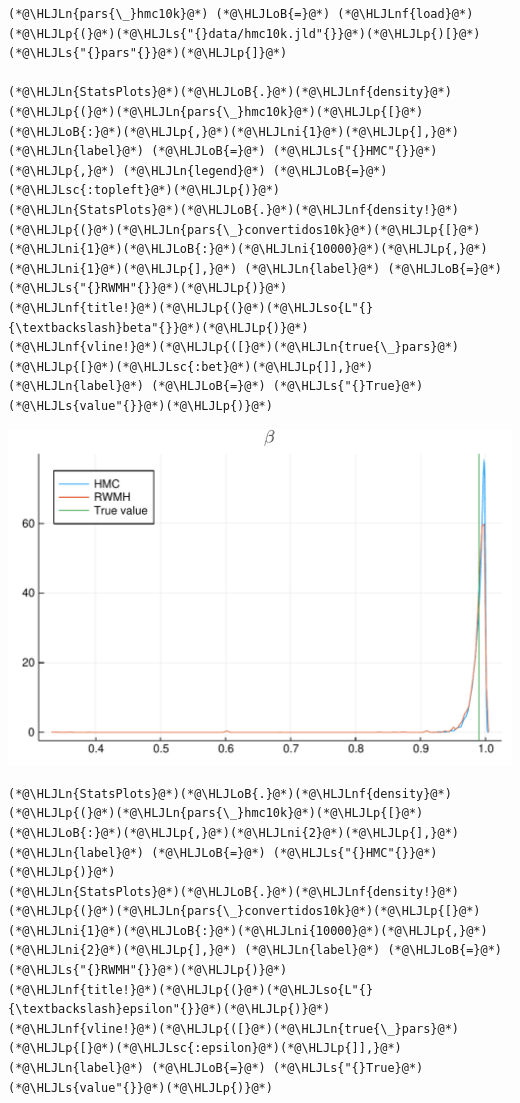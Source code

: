 \documentclass[12pt,a4paper]{article}
\newcommand{\HLJLn}[1]{#1}
\newcommand{\HLJLnf}[1]{\textcolor[RGB]{66,102,213}{#1}}
\newcommand{\HLJLs}[1]{\textcolor[RGB]{201,61,57}{#1}}
\newcommand{\HLJLsc}[1]{\textcolor[RGB]{201,61,57}{#1}}
\newcommand{\HLJLso}[1]{\textcolor[RGB]{201,61,57}{#1}}
\newcommand{\HLJLni}[1]{\textcolor[RGB]{59,151,46}{#1}}
\newcommand{\HLJLoB}[1]{\textcolor[RGB]{102,102,102}{\textbf{#1}}}
\newcommand{\HLJLp}[1]{#1}
\begin{document}
\begin{lstlisting}
(*@\HLJLn{pars{\_}hmc10k}@*) (*@\HLJLoB{=}@*) (*@\HLJLnf{load}@*)(*@\HLJLp{(}@*)(*@\HLJLs{"{}data/hmc10k.jld"{}}@*)(*@\HLJLp{)[}@*)(*@\HLJLs{"{}pars"{}}@*)(*@\HLJLp{]}@*)

(*@\HLJLn{StatsPlots}@*)(*@\HLJLoB{.}@*)(*@\HLJLnf{density}@*)(*@\HLJLp{(}@*)(*@\HLJLn{pars{\_}hmc10k}@*)(*@\HLJLp{[}@*)(*@\HLJLoB{:}@*)(*@\HLJLp{,}@*)(*@\HLJLni{1}@*)(*@\HLJLp{],}@*) (*@\HLJLn{label}@*) (*@\HLJLoB{=}@*) (*@\HLJLs{"{}HMC"{}}@*)(*@\HLJLp{,}@*) (*@\HLJLn{legend}@*) (*@\HLJLoB{=}@*) (*@\HLJLsc{:topleft}@*)(*@\HLJLp{)}@*)
(*@\HLJLn{StatsPlots}@*)(*@\HLJLoB{.}@*)(*@\HLJLnf{density!}@*)(*@\HLJLp{(}@*)(*@\HLJLn{pars{\_}convertidos10k}@*)(*@\HLJLp{[}@*)(*@\HLJLni{1}@*)(*@\HLJLoB{:}@*)(*@\HLJLni{10000}@*)(*@\HLJLp{,}@*)(*@\HLJLni{1}@*)(*@\HLJLp{],}@*) (*@\HLJLn{label}@*) (*@\HLJLoB{=}@*) (*@\HLJLs{"{}RWMH"{}}@*)(*@\HLJLp{)}@*)
(*@\HLJLnf{title!}@*)(*@\HLJLp{(}@*)(*@\HLJLso{L"{}{\textbackslash}beta"{}}@*)(*@\HLJLp{)}@*)
(*@\HLJLnf{vline!}@*)(*@\HLJLp{([}@*)(*@\HLJLn{true{\_}pars}@*)(*@\HLJLp{[}@*)(*@\HLJLsc{:bet}@*)(*@\HLJLp{]],}@*) (*@\HLJLn{label}@*) (*@\HLJLoB{=}@*) (*@\HLJLs{"{}True}@*) (*@\HLJLs{value"{}}@*)(*@\HLJLp{)}@*)
\end{lstlisting}

\includegraphics[width=\linewidth]{figures/dsge_and_julia_53_1.pdf}

\begin{lstlisting}
(*@\HLJLn{StatsPlots}@*)(*@\HLJLoB{.}@*)(*@\HLJLnf{density}@*)(*@\HLJLp{(}@*)(*@\HLJLn{pars{\_}hmc10k}@*)(*@\HLJLp{[}@*)(*@\HLJLoB{:}@*)(*@\HLJLp{,}@*)(*@\HLJLni{2}@*)(*@\HLJLp{],}@*) (*@\HLJLn{label}@*) (*@\HLJLoB{=}@*) (*@\HLJLs{"{}HMC"{}}@*)(*@\HLJLp{)}@*)
(*@\HLJLn{StatsPlots}@*)(*@\HLJLoB{.}@*)(*@\HLJLnf{density!}@*)(*@\HLJLp{(}@*)(*@\HLJLn{pars{\_}convertidos10k}@*)(*@\HLJLp{[}@*)(*@\HLJLni{1}@*)(*@\HLJLoB{:}@*)(*@\HLJLni{10000}@*)(*@\HLJLp{,}@*)(*@\HLJLni{2}@*)(*@\HLJLp{],}@*) (*@\HLJLn{label}@*) (*@\HLJLoB{=}@*) (*@\HLJLs{"{}RWMH"{}}@*)(*@\HLJLp{)}@*)
(*@\HLJLnf{title!}@*)(*@\HLJLp{(}@*)(*@\HLJLso{L"{}{\textbackslash}epsilon"{}}@*)(*@\HLJLp{)}@*)
(*@\HLJLnf{vline!}@*)(*@\HLJLp{([}@*)(*@\HLJLn{true{\_}pars}@*)(*@\HLJLp{[}@*)(*@\HLJLsc{:epsilon}@*)(*@\HLJLp{]],}@*) (*@\HLJLn{label}@*) (*@\HLJLoB{=}@*) (*@\HLJLs{"{}True}@*) (*@\HLJLs{value"{}}@*)(*@\HLJLp{)}@*)
\end{lstlisting}
\end{document}
